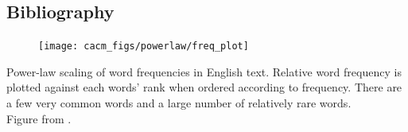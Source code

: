 \documentclass[16pt]{beamer}
\begin{document}

\subsection{Bibliography}

	\begin{frame}[t,allowframebreaks]{}


\end{frame}


\begin{frame}[t]{}
\begin{figure}[t]
    \begin{center}
        \texttt{[image: cacm\_figs/powerlaw/freq\_plot]}
    \end{center}
    \label{fig:powerlaw}
\end{figure}
Power-law scaling of word frequencies in
    English text. Relative word frequency  is plotted against each words' rank when ordered according to
    frequency. There are a few very common words and a large
    number of relatively rare words. \\ {\tiny Figure from \cite{Wood2011}}.
\end{frame}	
\end{document}
